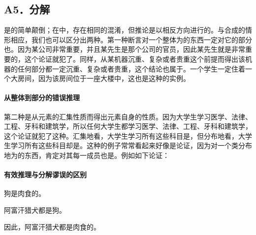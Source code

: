 \subsection{A5．分解}

\begin{theorembox}[title=分解谬误的定义]
是的简单颠倒；在中，存在相同的混淆，但推论是以相反方向进行的。与合成的情形相应，我们也可以区分出两种。第一种断言对一个整体为的东西一定对它的部分也。因为某公司非常重要，并且某先生是那个公司的官员，因此某先生就是非常重要的，这个论证就犯了。同样，从某机器沉重、复杂或者贵重这个前提而得出该机器的任何部分都一定沉重、复杂或者贵重，这个结论也属于。一个学生一定住着一个大房间，因为该房间位于一座大楼中，这也是这种的实例。
\end{theorembox}

\paragraph{从整体到部分的错误推理}
\begin{examplebox}[title=从整体到部分的错误推理]
第二种是从元素的汇集性质而得出元素自身的性质。因为大学生学习医学、法律、工程、牙科和建筑学，所以任何大学生都学习医学、法律、工程、牙科和建筑学，这个论证就犯了这种。汇集地看，大学生学习所有这些科目是，但分布地看，大学生学习所有这些科目却是。这种的例子常常看起来好像是论证，因为对一个类分布地为的东西，肯定对其每一成员也是。例如如下论证：
\end{examplebox}

\paragraph{有效推理与分解谬误的区别}
\begin{examplebox}[title=有效推理与分解谬误的区别]
狗是肉食的。

阿富汗猎犬都是狗。

因此，阿富汗猎犬都是肉食的。
\end{examplebox}